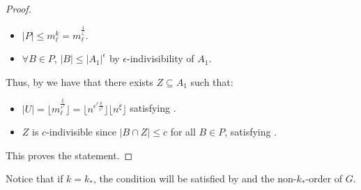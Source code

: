 \begin{lemma}[Claim 4.21]
\begin{proof}
\begin{itemize}
                \item $|P| \leq m_\ell^k = m_\ell^{\frac{1}{\zeta}}$.
                \item $\forall B \in P$, $|B| \leq |A_1|^\epsilon$ by $\epsilon$-indivisibility of $A_1$.
            \end{itemize}
            Thus, by  we have that there exists $Z \subseteq A_1$ such that:
            \begin{itemize}
                \item $|U| = \lfloor m_\ell^{\frac{\xi}{\epsilon^\ell}} \rfloor = \lfloor n^{\epsilon^\ell \frac{\xi}{\epsilon^\ell}} \rfloor
                    \lfloor n^\xi \rfloor$ satisfying .
                \item $Z$ is $c$-indivisible since $|B \cap Z| \leq c$ for all $B \in P$,
                    satisfying .
            \end{itemize}
            This proves the statement.
        \end{proof}
    \end{lemma}

    \begin{remark}[Remark 4.22] \label{rmk:k_asterisk_enough_for_k}
        Notice that if $k = k_*$, the condition  will be satisfied by 
        and the non-$k_*$-order of $G$.
    \end{remark}

